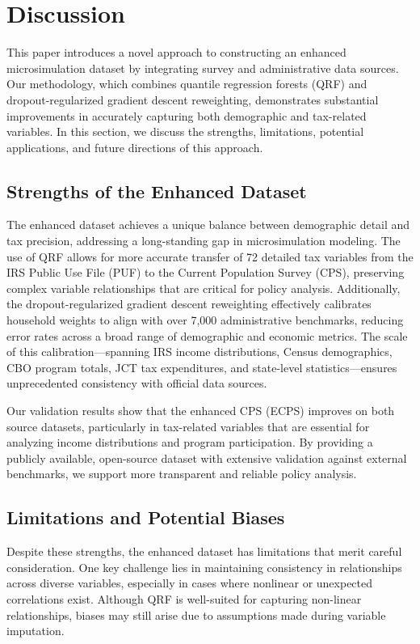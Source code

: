 \section{Discussion}

This paper introduces a novel approach to constructing an enhanced microsimulation dataset by integrating survey and administrative data sources. Our methodology, which combines quantile regression forests (QRF) and dropout-regularized gradient descent reweighting, demonstrates substantial improvements in accurately capturing both demographic and tax-related variables. In this section, we discuss the strengths, limitations, potential applications, and future directions of this approach.

\subsection{Strengths of the Enhanced Dataset}

The enhanced dataset achieves a unique balance between demographic detail and tax precision, addressing a long-standing gap in microsimulation modeling. The use of QRF allows for more accurate transfer of 72 detailed tax variables from the IRS Public Use File (PUF) to the Current Population Survey (CPS), preserving complex variable relationships that are critical for policy analysis. Additionally, the dropout-regularized gradient descent reweighting effectively calibrates household weights to align with over 7,000 administrative benchmarks, reducing error rates across a broad range of demographic and economic metrics. The scale of this calibration—spanning IRS income distributions, Census demographics, CBO program totals, JCT tax expenditures, and state-level statistics—ensures unprecedented consistency with official data sources.

Our validation results show that the enhanced CPS (ECPS) improves on both source datasets, particularly in tax-related variables that are essential for analyzing income distributions and program participation. By providing a publicly available, open-source dataset with extensive validation against external benchmarks, we support more transparent and reliable policy analysis.

\subsection{Limitations and Potential Biases}

Despite these strengths, the enhanced dataset has limitations that merit careful consideration. One key challenge lies in maintaining consistency in relationships across diverse variables, especially in cases where nonlinear or unexpected correlations exist. Although QRF is well-suited for capturing non-linear relationships, biases may still arise due to assumptions made during variable imputation.

